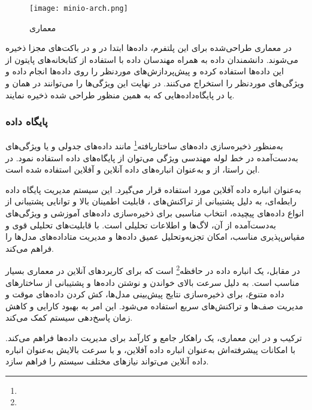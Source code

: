 \begin{figure}[t]
	\centering
	\texttt{[image: minio-arch.png]}
	\caption{معماری }
	\label{fig: minio arch}
\end{figure}

در معماری طراحی‌شده برای این پلتفرم، داده‌ها ابتدا در  و در باکت‌های مجزا ذخیره می‌شوند. دانشمندان داده به همراه مهندسان داده با استفاده از کتابخانه‌های پایتون از این داده‌ها استفاده کرده و پیش‌پردازش‌های موردنظر را روی داده‌ها انجام داده و ویژگی‌های موردنظر را استخراج می‌کنند. در نهایت این ویژگی‌ها را می‌توانند در همان  و یا در پایگاه‌داده‌هایی که به همین منظور طراحی شده ذخیره نمایند.


\subsubsection{پایگاه داده}
به‌منظور ذخیره‌سازی داده‌های ساختاریافته\footnote{} مانند داده‌های جدولی و یا ویژگی‌های به‌دست‌آمده در خط لوله مهندسی ویژگی می‌توان از پایگاه‌های داده استفاده نمود. در این راستا، از  و  به‌عنوان انباره‌های داده آنلاین و آفلاین استفاده شده است.

به‌عنوان انباره داده آفلاین مورد استفاده قرار می‌گیرد. این سیستم مدیریت پایگاه داده رابطه‌ای، به دلیل پشتیبانی از تراکنش‌های ، قابلیت اطمینان بالا و توانایی پشتیبانی از انواع داده‌های پیچیده، انتخاب مناسبی برای ذخیره‌سازی داده‌های آموزشی و ویژگی‌های به‌دست‌آمده از آن، لاگ‌ها و اطلاعات تحلیلی است.  با قابلیت‌های تحلیلی قوی و مقیاس‌پذیری مناسب، امکان تجزیه‌وتحلیل عمیق داده‌ها و مدیریت متاداده‌های مدل‌ها را فراهم می‌کند.

در مقابل،  یک انباره داده در حافظه\footnote{} است که برای کاربردهای آنلاین در معماری  بسیار مناسب است.  به دلیل سرعت بالای خواندن و نوشتن داده‌ها و پشتیبانی از ساختارهای داده متنوع، برای ذخیره‌سازی نتایج پیش‌بینی مدل‌ها، کش کردن داده‌های موقت و مدیریت صف‌ها و تراکنش‌های سریع استفاده می‌شود. این امر به بهبود کارایی و کاهش زمان پاسخ‌دهی سیستم کمک می‌کند.

ترکیب  و  در این معماری، یک راهکار جامع و کارآمد برای مدیریت داده‌ها فراهم می‌کند.  با امکانات پیشرفته‌اش به‌عنوان انباره داده آفلاین، و  با سرعت بالایش به‌عنوان انباره داده آنلاین می‌تواند نیازهای مختلف سیستم را فراهم سازد.


